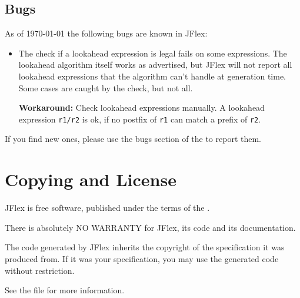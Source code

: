 \documentclass[11pt]{scrartcl}
\newcommand{\ver}{1.4}
\begin{document}
\subsection{Bugs}

As of {\today} the following bugs are known in JFlex:
\begin{itemize}
\item The check if a lookahead expression is legal fails on some expressions.
  The lookahead algorithm itself works as advertised, but JFlex will not
  report all lookahead expressions that the algorithm can't handle at generation
  time. Some cases are caught by the check, but not all.

  {\bf Workaround:} Check lookahead expressions manually. A lookahead expression 
  \texttt{r1/r2} is ok, if no postfix of \texttt{r1} can match a prefix of \texttt{r2}.
\end{itemize}

If you find new ones, please use the bugs section of the
to report them.
 
 
\section{Copying and License\label{Copyright}}
JFlex is free software, published under the terms of the 
.

There is absolutely NO WARRANTY for JFlex, its code and its documentation.

The code generated by JFlex inherits the copyright of the specification it
was produced from. If it was your specification, you may use the generated 
code without restriction.

See the file  for more information.  
\end{document}
